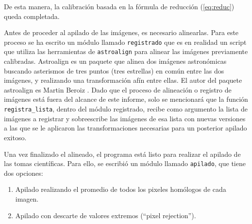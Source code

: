 \documentclass[a4paper, 12pt]{article}
\begin{document}
De esta manera, la calibración basada en la fórmula de reducción (\ref{eq:reduc}) queda completada.

Antes de proceder al apilado de las imágenes, es necesario alinearlas. Para este proceso se ha escrito un módulo llamado \texttt{registrado} que es en realidad un script que utiliza las herramientas de \texttt{astroalign} para alinear las imágenes previamente calibradas. Astroalign es un paquete que alinea dos imágenes astronómicas buscando asterismos de tres puntos (tres estrellas) en común entre las dos imágenes, y
realizando una transformación afín entre ellas. El autor del paquete astroalign es Martin Beroiz \cite{astroalign}. Dado que el proceso de alineación o registro de imágenes está fuera del alcance de este informe, solo se mencionará que la función \texttt{registra\_lista}, dentro del módulo registrado, recibe como argumento la lista de imágenes a registrar y sobreescribe las imágenes de esa lista con nuevas versiones a las que se le aplicaron las transformaciones necesarias para un posterior apilado exitoso.

Una vez finalizado el alineado, el programa está listo para realizar el apilado de las tomas científicas. Para ello, se escribió un módulo llamado \texttt{apilado}, que tiene dos opciones:
\begin{enumerate}
\item Apilado realizando el promedio de todos los pixeles homólogos de cada imagen.
\item Apilado con descarte de valores extremos (``pixel rejection'').
\end{enumerate}






 

 



   
\end{document}
